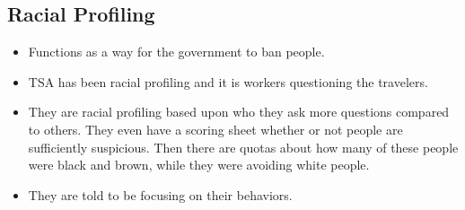 \documentclass{article}
\begin{document}
\subsection{Racial Profiling}
\begin{itemize}
  \item Functions as a way for the government to ban people.
  \item TSA has been racial profiling and it is workers questioning the
    travelers.
  \item They are racial profiling based upon who they ask more questions compared to others.
    They even have a scoring sheet whether or not people are sufficiently suspicious.
    Then there are quotas about how many of these people were black and brown, while they were
    avoiding white people. 
  \item They are told to be focusing on their behaviors.
\end{itemize}
\end{document}
